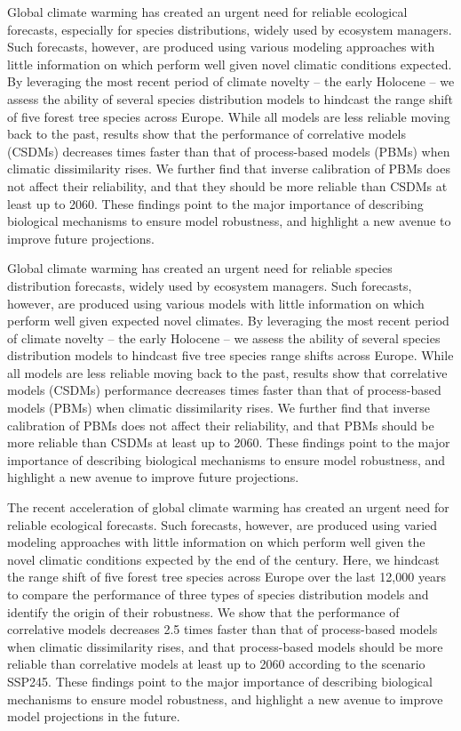 Global climate warming has created an urgent need for reliable  ecological forecasts, especially for species distributions, widely used by ecosystem managers. Such forecasts, however, are produced using various modeling approaches with little information on which perform well given novel climatic conditions expected.
By leveraging the most recent period of climate novelty -- the early Holocene -- we assess the ability of several species distribution models to hindcast the range shift of five forest tree species across Europe. While all models are less reliable moving back to the past, results show that the performance of correlative models (CSDMs) decreases  times faster than that of process-based models (PBMs) when climatic dissimilarity rises. We further find that inverse calibration of PBMs does not affect their reliability, and that they should be more reliable than CSDMs at least up to 2060. 
These findings point to the major importance of describing biological mechanisms to ensure model robustness, and highlight a new avenue to improve future projections.


Global climate warming has created an urgent need for reliable  species distribution forecasts, widely used by ecosystem managers. Such forecasts, however, are produced using various models with little information on which perform well given expected novel climates.
By leveraging the most recent period of climate novelty -- the early Holocene -- we assess the ability of several species distribution models to hindcast five tree species range shifts across Europe. While all models are less reliable moving back to the past, results show that correlative models (CSDMs) performance decreases  times faster than that of process-based models (PBMs) when climatic dissimilarity rises. We further find that inverse calibration of PBMs does not affect their reliability, and that PBMs should be more reliable than CSDMs at least up to 2060. 
These findings point to the major importance of describing biological mechanisms to ensure model robustness, and highlight a new avenue to improve future projections.

The recent acceleration of global climate warming has created an urgent need for reliable ecological forecasts. Such forecasts, however, are produced using varied modeling approaches with little information on which perform well given the novel climatic conditions expected by the end of the century. Here, we hindcast the range shift of five forest tree species across Europe over the last 12,000 years to compare the performance of three types of species distribution models and identify the origin of their robustness. We show that the performance of correlative models decreases 2.5 times faster than that of process-based models when climatic dissimilarity rises, and that process-based models should be more reliable than correlative models at least up to 2060 according to the scenario SSP245. These findings point to the major importance of describing biological mechanisms to ensure model robustness, and highlight a new avenue to improve model projections in the future.


